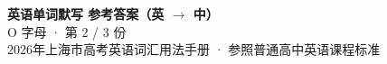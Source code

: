 \documentclass[10pt,a4paper]{article}
\begin{document}
\pagestyle{plain}

\begin{center}
{\LARGE\bfseries 英语单词默写 \quad 参考答案（英 $\to$ 中）}\\[0.22em]
{\large O 字母 · 第 2 / 3 份}\\[0.18em]
{\small 2026年上海市高考英语词汇用法手册 · 参照普通高中英语课程标准}
\end{center}

\vspace{0.2em}
\noindent{\color{rulegray}\rule{\textwidth}{0.8pt}}

\vspace{0.35em}

\vspace{0.25em}
\renewcommand{\arraystretch}{1.32}
\end{document}
